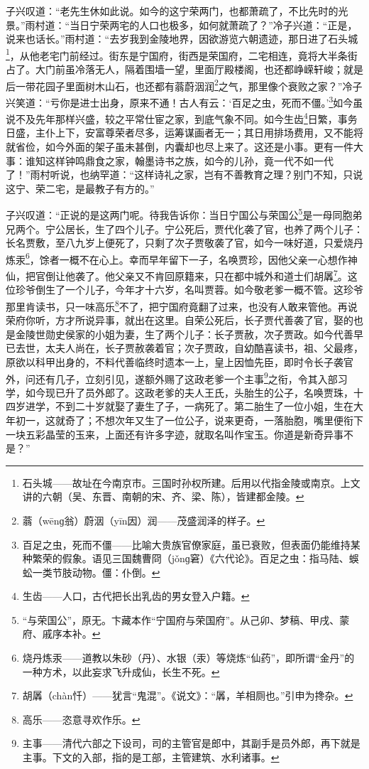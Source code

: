 \par 子兴叹道：“老先生休如此说。如今的这宁荣两门，也都萧疏了，不比先时的光景。”雨村道：“当日宁荣两宅的人口也极多，如何就萧疏了？”冷子兴道：“正是，说来也话长。”雨村道：“去岁我到金陵地界，因欲游览六朝遗迹，那日进了石头城\footnote{石头城——故址在今南京市。三国时孙权所建。后用以代指金陵或南京。上文讲的六朝（吴、东晋、南朝的宋、齐、梁、陈），皆建都金陵。}，从他老宅门前经过。街东是宁国府，街西是荣国府，二宅相连，竟将大半条街占了。大门前虽冷落无人，隔着围墙一望，里面厅殿楼阁，也还都峥嵘轩峻；就是后一带花园子里面树木山石，也还都有蓊蔚洇润\footnote{蓊（wēnɡ翁）蔚洇（yīn因）润——茂盛润泽的样子。}之气，那里像个衰败之家？”冷子兴笑道：“亏你是进士出身，原来不通！古人有云：‘百足之虫，死而不僵。’\footnote{百足之虫，死而不僵——比喻大贵族官僚家庭，虽已衰败，但表面仍能维持某种繁荣的假象。语见三国魏曹冏（jǒnɡ窘）《六代论》。百足之虫：指马陆、蜈蚣一类节肢动物。僵：仆倒。}如今虽说不及先年那样兴盛，较之平常仕宦之家，到底气象不同。如今生齿\footnote{生齿——人口，古代把长出乳齿的男女登入户籍。}日繁，事务日盛，主仆上下，安富尊荣者尽多，运筹谋画者无一；其日用排场费用，又不能将就省俭，如今外面的架子虽未甚倒，内囊却也尽上来了。这还是小事。更有一件大事：谁知这样钟鸣鼎食之家，翰墨诗书之族，如今的儿孙，竟一代不如一代了！”雨村听说，也纳罕道：“这样诗礼之家，岂有不善教育之理？别门不知，只说这宁、荣二宅，是最教子有方的。”
\par 子兴叹道：“正说的是这两门呢。待我告诉你：当日宁国公与荣国公\footnote{“与荣国公”，原无。卞藏本作“宁国府与荣国府”。从己卯、梦稿、甲戌、蒙府、戚序本补。}是一母同胞弟兄两个。宁公居长，生了四个儿子。宁公死后，贾代化袭了官，也养了两个儿子：长名贾敷，至八九岁上便死了，只剩了次子贾敬袭了官，如今一味好道，只爱烧丹炼汞\footnote{烧丹炼汞——道教以朱砂（丹）、水银（汞）等烧炼“仙药”，即所谓“金丹”的一种方术，以此妄求飞升成仙，长生不死。}，馀者一概不在心上。幸而早年留下一子，名唤贾珍，因他父亲一心想作神仙，把官倒让他袭了。他父亲又不肯回原籍来，只在都中城外和道士们胡羼\footnote{胡羼（chàn忏）——犹言“鬼混”。《说文》：“羼，羊相厕也。”引申为搀杂。}。这位珍爷倒生了一个儿子，今年才十六岁，名叫贾蓉。如今敬老爹一概不管。这珍爷那里肯读书，只一味高乐\footnote{高乐——恣意寻欢作乐。}不了，把宁国府竟翻了过来，也没有人敢来管他。再说荣府你听，方才所说异事，就出在这里。自荣公死后，长子贾代善袭了官，娶的也是金陵世勋史侯家的小姐为妻，生了两个儿子：长子贾赦，次子贾政。如今代善早已去世，太夫人尚在，长子贾赦袭着官；次子贾政，自幼酷喜读书，祖、父最疼，原欲以科甲出身的，不料代善临终时遗本一上，皇上因恤先臣，即时令长子袭官外，问还有几子，立刻引见，遂额外赐了这政老爹一个主事\footnote{主事——清代六部之下设司，司的主管官是郎中，其副手是员外郎，再下就是主事。下文的入部，指的是工部，主管建筑、水利诸事。}之衔，令其入部习学，如今现已升了员外郎了。这政老爹的夫人王氏，头胎生的公子，名唤贾珠，十四岁进学，不到二十岁就娶了妻生了子，一病死了。第二胎生了一位小姐，生在大年初一，这就奇了；不想次年又生了一位公子，说来更奇，一落胎胞，嘴里便衔下一块五彩晶莹的玉来，上面还有许多字迹，就取名叫作宝玉。你道是新奇异事不是？”
